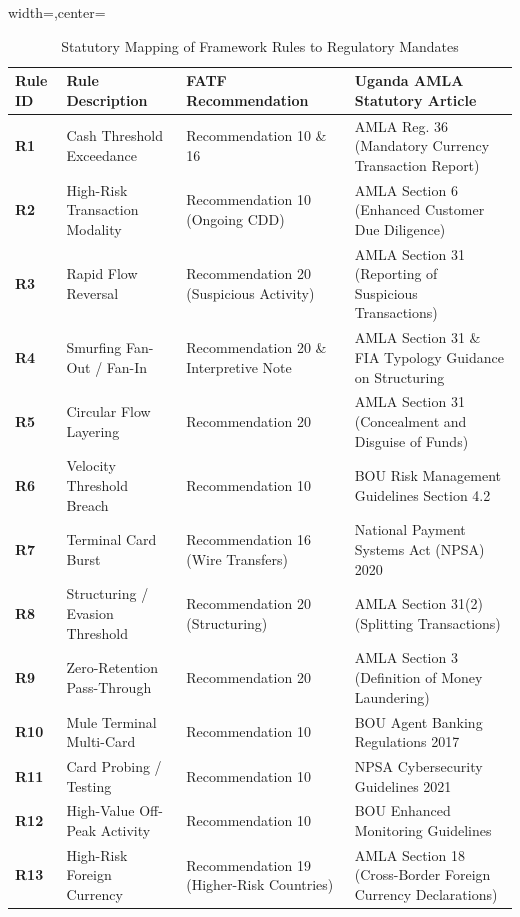 \begin{table}[hbt!]
\centering
\caption{Statutory Mapping of Framework Rules to Regulatory Mandates}
\label{tab:regulatory_mapping}
\begin{adjustbox}{width=\textwidth,center=\textwidth}
\begin{tabular}{|l|l|l|l|}
\hline
\rowcolor{gray!40}
\textbf{Rule ID} & \textbf{Rule Description} & \textbf{FATF Recommendation} & \textbf{Uganda AMLA Statutory Article} \\
\hline
\textbf{R1} & Cash Threshold Exceedance & Recommendation 10 \& 16 & AMLA Reg. 36 (Mandatory Currency Transaction Report) \\
\hline
\textbf{R2} & High-Risk Transaction Modality & Recommendation 10 (Ongoing CDD) & AMLA Section 6 (Enhanced Customer Due Diligence) \\
\hline
\textbf{R3} & Rapid Flow Reversal & Recommendation 20 (Suspicious Activity) & AMLA Section 31 (Reporting of Suspicious Transactions) \\
\hline
\textbf{R4} & Smurfing Fan-Out / Fan-In & Recommendation 20 \& Interpretive Note & AMLA Section 31 \& FIA Typology Guidance on Structuring \\
\hline
\textbf{R5} & Circular Flow Layering & Recommendation 20 & AMLA Section 31 (Concealment and Disguise of Funds) \\
\hline
\textbf{R6} & Velocity Threshold Breach & Recommendation 10 & BOU Risk Management Guidelines Section 4.2 \\
\hline
\textbf{R7} & Terminal Card Burst & Recommendation 16 (Wire Transfers) & National Payment Systems Act (NPSA) 2020 \\
\hline
\textbf{R8} & Structuring / Evasion Threshold & Recommendation 20 (Structuring) & AMLA Section 31(2) (Splitting Transactions) \\
\hline
\textbf{R9} & Zero-Retention Pass-Through & Recommendation 20 & AMLA Section 3 (Definition of Money Laundering) \\
\hline
\textbf{R10} & Mule Terminal Multi-Card & Recommendation 10 & BOU Agent Banking Regulations 2017 \\
\hline
\textbf{R11} & Card Probing / Testing & Recommendation 10 & NPSA Cybersecurity Guidelines 2021 \\
\hline
\textbf{R12} & High-Value Off-Peak Activity & Recommendation 10 & BOU Enhanced Monitoring Guidelines \\
\hline
\textbf{R13} & High-Risk Foreign Currency & Recommendation 19 (Higher-Risk Countries) & AMLA Section 18 (Cross-Border Foreign Currency Declarations) \\

\end{tabular}
\end{adjustbox}
\end{table}
